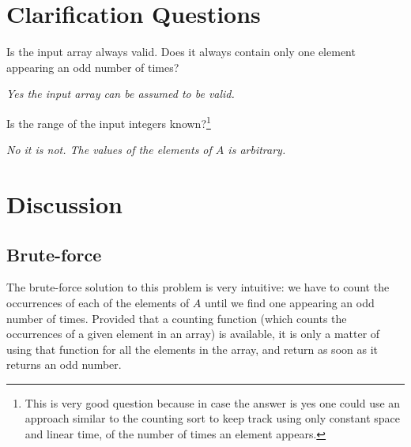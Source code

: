 \section{Clarification Questions}

\begin{QandA}
	\item \begin{questionitem} \begin{question} Is the input array always valid. Does it always contain only one element appearing an odd number of times?  \end{question} 	 
    \begin{answered}
		\textit{Yes the input array can be assumed to be valid.}
	\end{answered} \end{questionitem}
	\item \begin{questionitem} \begin{question} Is the range of the input integers known?\footnote{This is very good question because in case the answer is yes one could use an approach similar to the counting sort to keep track using only constant space and linear time, of the number of times an element appears.}  \end{question} 	 
    \begin{answered}
		\textit{No it is not. The values of the elements of $A$ is arbitrary.}
	\end{answered} \end{questionitem}
	
\end{QandA}

\section{Discussion}

\subsection{Brute-force}
\label{find_odd_occurring_element:sec:bruteforce}

The brute-force solution to this problem is very intuitive: we have to count the occurrences of each of the elements of $A$ until we find one appearing an odd number of times.  
Provided that a counting function (which counts the occurrences of a given element in an array) is available, it is only a matter of using that function for all the elements in the array, and return as soon as it returns an odd number. 

